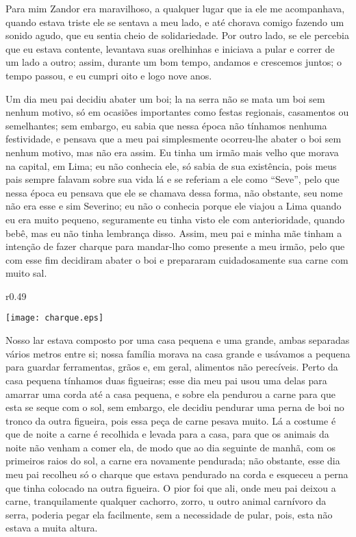 Para mim Zandor era maravilhoso, a qualquer lugar que ia ele me acompanhava, quando estava triste ele se sentava a meu lado, e até chorava comigo fazendo um sonido agudo, que eu sentia cheio de solidariedade. 
Por outro lado, se ele percebia que eu estava contente, levantava suas orelhinhas e iniciava a pular e correr de um lado a outro; assim, durante um bom tempo, andamos e crescemos juntos; o tempo passou, e eu cumpri oito e logo nove anos.

Um dia meu pai decidiu abater um boi; la na serra não se mata um boi sem nenhum motivo, só em ocasiões importantes como festas regionais, casamentos ou semelhantes; sem embargo, eu sabia que nessa época não tínhamos nenhuma festividade, e pensava que a meu pai simplesmente ocorreu-lhe abater o boi sem nenhum motivo, mas não era assim. 
Eu tinha um irmão mais velho que morava na capital, em Lima; eu não conhecia ele, só sabia de sua existência, pois meus pais sempre falavam sobre sua vida lá e se referiam a ele como ``Seve'', pelo que nessa época eu pensava que ele se chamava dessa forma, não obstante, seu nome não era esse e sim Severino; eu não o conhecia porque ele viajou a Lima quando eu era muito pequeno, seguramente eu tinha visto ele com anterioridade, quando bebê, mas eu não tinha lembrança disso. 
Assim, meu pai e minha mãe tinham a intenção de fazer charque para mandar-lho como presente a meu irmão, pelo que com esse fim decidiram abater o boi e prepararam cuidadosamente sua carne com muito sal.

\begin{wrapfigure}{r}{0.49\textwidth}
  \begin{center}
  \vspace{-20pt}
    \texttt{[image: charque.eps]}
  \end{center}
  \vspace{-20pt}
\end{wrapfigure}
Nosso lar estava composto por uma casa pequena e uma grande, ambas separadas vários metros entre si; nossa família morava na casa grande e usávamos a pequena para guardar ferramentas, grãos e, em geral, alimentos não perecíveis. Perto da casa pequena tínhamos duas figueiras; esse dia meu pai usou uma delas para amarrar uma corda até a casa pequena, e sobre ela pendurou a carne para que esta se seque com o sol, sem embargo, ele decidiu pendurar uma perna de boi no tronco da outra figueira, pois essa peça de carne pesava muito.
Lá a costume é que de noite a carne é recolhida e levada para a casa, para que os animais da noite não venham a comer ela, de modo que ao dia seguinte de manhã, com os primeiros raios do sol, a carne era novamente pendurada; não obstante, esse dia meu pai recolheu só o charque que estava pendurado na corda e esqueceu a perna que tinha colocado na outra figueira. 
O pior foi que ali, onde meu pai deixou a carne, tranquilamente qualquer cachorro, zorro, u outro animal carnívoro da serra, poderia pegar ela facilmente, sem a necessidade de pular, pois, esta não estava a muita altura.

